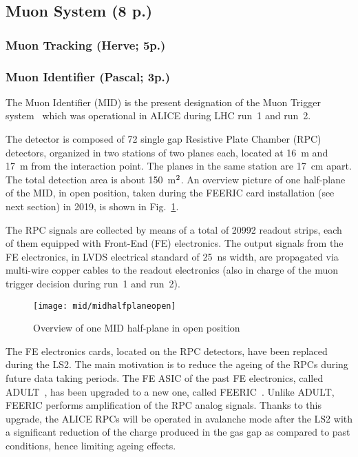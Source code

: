 \subsection{Muon System (8 p.)}
\subsubsection{Muon Tracking (Herve; 5p.)}
\subsubsection{Muon Identifier (Pascal; 3p.)}

The Muon Identifier (MID) is the present designation of the Muon Trigger system~\cite{Aamodt:2008zz} which was operational in ALICE during LHC run~1 and run~2. 

The detector is composed of 72 single gap Resistive Plate Chamber (RPC) detectors, organized in two stations of two planes each, located at 16~m and 17~m from 
the interaction point. The planes in the same station are 17~cm apart. The total detection area is about 150~m$^{\rm 2}$. An overview picture of one half-plane of the MID, in open position, taken during the FEERIC card 
installation (see next section) in 2019, is shown in Fig.~\ref{midhalfplaneopen}.

The RPC signals are collected by means of a total of 20992 readout strips, each of them equipped with Front-End (FE) electronics. The output signals from the FE electronics, in LVDS electrical standard of 25~ns width, 
are propagated via multi-wire copper cables to the readout electronics (also in charge of the muon trigger decision during run~1 and run~2). 

\begin{figure}
\centering 
\texttt{[image: mid/midhalfplaneopen]}
\caption{Overview of one MID half-plane in open position}
\label{midhalfplaneopen}
\end{figure}

The FE electronics cards, located on the RPC detectors, have been replaced during the LS2. The main motivation is to reduce the ageing of the RPCs during future data taking periods. 
The FE ASIC of the past FE electronics, called ADULT~\cite{mid:ADULT}, has been upgraded to a new one, called FEERIC~\cite{mid:FEERICref1,mid:FEERICref2}.
Unlike ADULT, FEERIC performs amplification of the RPC analog signals. Thanks to this upgrade, the ALICE RPCs will be operated in avalanche 
mode after the LS2 with a significant reduction of the charge produced in the gas gap as compared to past conditions, hence limiting ageing effects.

